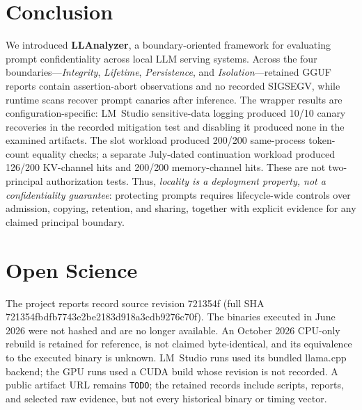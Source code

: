 \documentclass[journal,tifs]{IEEEtran}
\newcommand{\artifacturl}[1]{\texttt{#1}}
\begin{document}
 \section{Conclusion}\label{sec:conclusion}
 \vspace{-0.15cm}
We introduced \textbf{LLAnalyzer}, a boundary-oriented framework for evaluating
prompt confidentiality across local LLM serving systems. Across the four
boundaries---\emph{Integrity}, \emph{Lifetime}, \emph{Persistence}, and
\emph{Isolation}---retained GGUF reports contain assertion-abort observations
and no recorded SIGSEGV, while runtime scans recover prompt canaries after
inference. The wrapper results are configuration-specific: LM~Studio
sensitive-data logging produced 10/10 canary recoveries in the recorded
mitigation test and disabling it produced none in the examined artifacts.
The slot workload produced 200/200 same-process token-count equality checks;
a separate July-dated continuation workload produced 126/200 KV-channel hits
and 200/200 memory-channel hits. These are not two-principal authorization
tests. Thus, \emph{locality is a deployment property, not a confidentiality
guarantee}: protecting prompts requires lifecycle-wide controls over
admission, copying, retention, and sharing, together with explicit evidence
for any claimed principal boundary.




\section*{Open Science}
\label{app:open_science}

The project reports record source revision 721354f (full SHA
721354fbdfb7743e2be2183d918a3cdb9276c70f). The binaries executed in June
2026 were not hashed and are no longer available. An October 2026 CPU-only
rebuild is retained for reference, is not claimed byte-identical, and its
equivalence to the executed binary is unknown. LM~Studio runs used its
bundled llama.cpp backend; the GPU runs used a CUDA build whose revision is
not recorded. A public artifact URL remains \artifacturl{TODO}; the
retained records include scripts, reports, and selected raw evidence, but
not every historical binary or timing vector.
\end{document}
